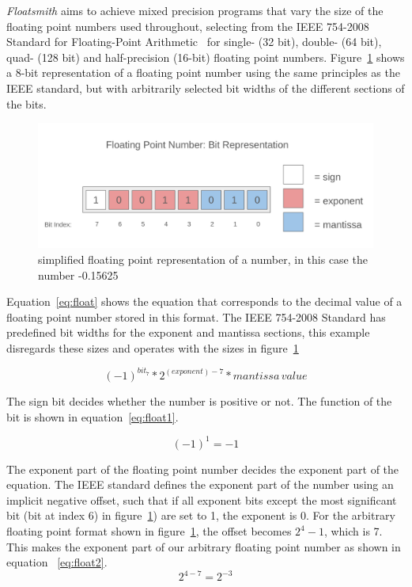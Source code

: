 \emph{Floatsmith} aims to achieve mixed precision programs that vary the size of the floating point numbers used throughout, selecting from the IEEE 754-2008 Standard for Floating-Point Arithmetic~\citep{ieee754} for single- (32 bit), double- (64 bit), quad- (128 bit) and half-precision (16-bit) floating point numbers. Figure~\ref{fig:float_bit_representation} shows a 8-bit representation of a floating point number using the same principles as the IEEE standard, but with arbitrarily selected bit widths of the different sections of the bits. 
\begin{figure}[h]
    \centering
    \includegraphics[width=0.5\linewidth]{Images/float_bit_representation.png}
    \caption{simplified floating point representation of a number, in this case the number -0.15625}
    \label{fig:float_bit_representation}
\end{figure}

Equation~\ref{eq:float} shows the equation that corresponds to the decimal value of a floating point number stored in this format. The IEEE 754-2008 Standard has predefined bit widths for the exponent and mantissa sections, this example disregards these sizes and operates with the sizes in figure~\ref{fig:float_bit_representation}

\begin{equation}\label{eq:float}
    (-1)^{bit_7} * 2^{(exponent) - 7} * mantissa \, value
\end{equation}

The sign bit decides whether the number is positive or not. The function of the bit is shown in equation~\ref{eq:float1}.

\begin{equation} \label{eq:float1}
    (-1)^{1} = -1
\end{equation}

The exponent part of the floating point number decides the exponent part of the equation. The IEEE standard defines the exponent part of the number using an implicit negative offset, such that if all exponent bits except the most significant bit (bit at index 6) in figure~\ref{fig:float_bit_representation}) are set to 1, the exponent is 0. For the arbitrary floating point format shown in figure~\ref{fig:float_bit_representation}, the offset becomes $2^4 - 1$, which is 7. This makes the exponent part of our arbitrary floating point number as shown in equation ~\ref{eq:float2}.
\begin{equation} \label{eq:float2}
    2^{4-7} = 2^{-3}
\end{equation}


